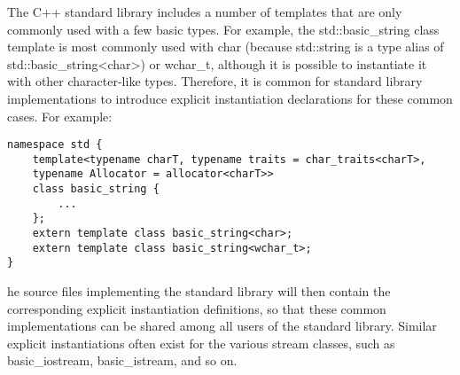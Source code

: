 The C++ standard library includes a number of templates that are only commonly used with a few basic types. For example, the std::basic\_string class template is most commonly used with char (because std::string is a type alias of std::basic\_string<char>) or wchar\_t, although it is possible to instantiate it with other character-like types. Therefore, it is common for standard library implementations to introduce explicit instantiation declarations for these common cases. For example:

\begin{lstlisting}[style=styleCXX]
namespace std {
	template<typename charT, typename traits = char_traits<charT>,
	typename Allocator = allocator<charT>>
	class basic_string {
		...
	};
	extern template class basic_string<char>;
	extern template class basic_string<wchar_t>;
}
\end{lstlisting}

he source files implementing the standard library will then contain the corresponding explicit instantiation definitions, so that these common implementations can be shared among all users of the standard library. Similar explicit instantiations often exist for the various stream classes, such as basic\_iostream, basic\_istream, and so on.